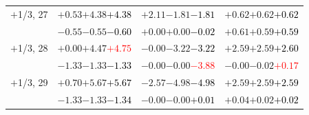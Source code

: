 \documentclass[compress]{beamer}
\begin{document}
\begin{frame}
\begin{tabular}{r | c | c | c}
$+$1/3, 27 & $+0.53$\hspace{0.1 cm}$+4.38$\hspace{0.1 cm}\textcolor{black}{$+4.38$} & $+2.11$\hspace{0.1 cm}$-1.81$\hspace{0.1 cm}\textcolor{black}{$-1.81$} & $+0.62$\hspace{0.1 cm}$+0.62$\hspace{0.1 cm}\textcolor{black}{$+0.62$} \\
           & $-0.55$\hspace{0.1 cm}$-0.55$\hspace{0.1 cm}\textcolor{black}{$-0.60$} & $+0.00$\hspace{0.1 cm}$+0.00$\hspace{0.1 cm}\textcolor{black}{$-0.02$} & $+0.61$\hspace{0.1 cm}$+0.59$\hspace{0.1 cm}\textcolor{black}{$+0.59$} \\
$+$1/3, 28 & $+0.00$\hspace{0.1 cm}$+4.47$\hspace{0.1 cm}\textcolor{red}{$+4.75$} & $-0.00$\hspace{0.1 cm}$-3.22$\hspace{0.1 cm}\textcolor{black}{$-3.22$} & $+2.59$\hspace{0.1 cm}$+2.59$\hspace{0.1 cm}\textcolor{black}{$+2.60$} \\
           & $-1.33$\hspace{0.1 cm}$-1.33$\hspace{0.1 cm}\textcolor{black}{$-1.33$} & $-0.00$\hspace{0.1 cm}$-0.00$\hspace{0.1 cm}\textcolor{red}{$-3.88$} & $-0.00$\hspace{0.1 cm}$-0.02$\hspace{0.1 cm}\textcolor{red}{$+0.17$} \\
$+$1/3, 29 & $+0.70$\hspace{0.1 cm}$+5.67$\hspace{0.1 cm}\textcolor{black}{$+5.67$} & $-2.57$\hspace{0.1 cm}$-4.98$\hspace{0.1 cm}\textcolor{black}{$-4.98$} & $+2.59$\hspace{0.1 cm}$+2.59$\hspace{0.1 cm}\textcolor{black}{$+2.59$} \\
           & $-1.33$\hspace{0.1 cm}$-1.33$\hspace{0.1 cm}\textcolor{black}{$-1.34$} & $-0.00$\hspace{0.1 cm}$-0.00$\hspace{0.1 cm}\textcolor{black}{$+0.01$} & $+0.04$\hspace{0.1 cm}$+0.02$\hspace{0.1 cm}\textcolor{black}{$+0.02$} \\

\end{tabular}
\end{frame}
\end{document}
